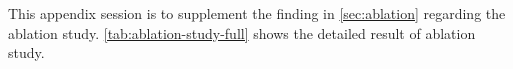 This appendix session is to supplement the finding in \autoref{sec:ablation} regarding the ablation study. \autoref{tab:ablation-study-full} shows the detailed result of ablation study.

